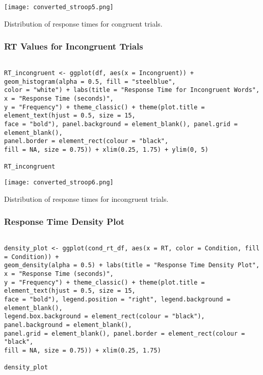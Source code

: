 \documentclass{article}
\begin{document}
\begin{center}
\texttt{[image: converted\_stroop5.png]}
\end{center}

\begin{center}
Distribution of response times for congruent trials.
\end{center}

\subsubsection{RT Values for Incongruent Trials}
\label{sec:orga10da14}
\begin{verbatim}

RT_incongruent <- ggplot(df, aes(x = Incongruent)) + geom_histogram(alpha = 0.5, fill = "steelblue", 
color = "white") + labs(title = "Response Time for Incongruent Words", x = "Response Time (seconds)", 
y = "Frequency") + theme_classic() + theme(plot.title = element_text(hjust = 0.5, size = 15, 
face = "bold"), panel.background = element_blank(), panel.grid = element_blank(), 
panel.border = element_rect(colour = "black", 
fill = NA, size = 0.75)) + xlim(0.25, 1.75) + ylim(0, 5)

RT_incongruent

\end{verbatim}

\begin{center}
\texttt{[image: converted\_stroop6.png]}
\end{center}

\begin{center}
Distribution of response times for incongruent trials.
\end{center}
\subsubsection{Response Time Density Plot}
\label{sec:org2d6847b}
\begin{verbatim}

density_plot <- ggplot(cond_rt_df, aes(x = RT, color = Condition, fill = Condition)) + 
geom_density(alpha = 0.5) + labs(title = "Response Time Density Plot", x = "Response Time (seconds)", 
y = "Frequency") + theme_classic() + theme(plot.title = element_text(hjust = 0.5, size = 15, 
face = "bold"), legend.position = "right", legend.background = element_blank(), 
legend.box.background = element_rect(colour = "black"), panel.background = element_blank(), 
panel.grid = element_blank(), panel.border = element_rect(colour = "black", 
fill = NA, size = 0.75)) + xlim(0.25, 1.75) 

density_plot

\end{verbatim}
\end{document}
